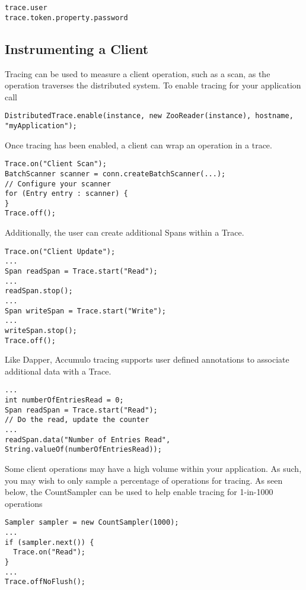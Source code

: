 \begingroup\fontsize{8pt}{8pt}\selectfont\begin{verbatim}
trace.user
trace.token.property.password
\end{verbatim}\endgroup

\subsection{Instrumenting a Client}
Tracing can be used to measure a client operation, such as a scan, as
the operation traverses the distributed system. To enable tracing for
your application call

\begingroup\fontsize{8pt}{8pt}\selectfont\begin{verbatim}
DistributedTrace.enable(instance, new ZooReader(instance), hostname, "myApplication");
\end{verbatim}\endgroup

Once tracing has been enabled, a client can wrap an operation in a trace.

\begingroup\fontsize{8pt}{8pt}\selectfont\begin{verbatim}
Trace.on("Client Scan");
BatchScanner scanner = conn.createBatchScanner(...);
// Configure your scanner
for (Entry entry : scanner) {
}
Trace.off();
\end{verbatim}\endgroup

Additionally, the user can create additional Spans within a Trace.
\begingroup\fontsize{8pt}{8pt}\selectfont\begin{verbatim}
Trace.on("Client Update");
...
Span readSpan = Trace.start("Read");
...
readSpan.stop();
...
Span writeSpan = Trace.start("Write");
...
writeSpan.stop();
Trace.off();
\end{verbatim}\endgroup

Like Dapper, Accumulo tracing supports user defined annotations to associate additional data with a Trace.
\begingroup\fontsize{8pt}{8pt}\selectfont\begin{verbatim}
...
int numberOfEntriesRead = 0;
Span readSpan = Trace.start("Read");
// Do the read, update the counter
...
readSpan.data("Number of Entries Read", String.valueOf(numberOfEntriesRead));
\end{verbatim}\endgroup

Some client operations may have a high volume within your
application. As such, you may wish to only sample a percentage of
operations for tracing. As seen below, the CountSampler can be used to
help enable tracing for 1-in-1000 operations
\begingroup\fontsize{8pt}{8pt}\selectfont\begin{verbatim}
Sampler sampler = new CountSampler(1000);
...
if (sampler.next()) {
  Trace.on("Read");
}
...
Trace.offNoFlush();
\end{verbatim}\endgroup

